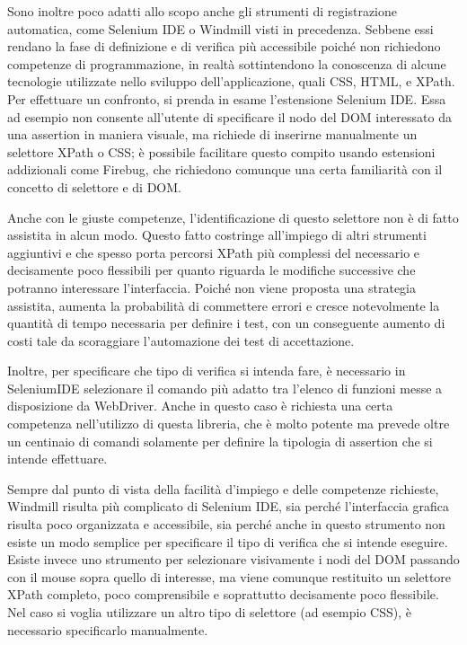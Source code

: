 Sono inoltre poco adatti allo scopo anche gli strumenti di registrazione automatica, come Selenium IDE o Windmill visti in precedenza. Sebbene essi rendano la fase di definizione e di verifica più accessibile poiché non richiedono competenze di programmazione, in realtà sottintendono la conoscenza di alcune tecnologie utilizzate nello sviluppo dell'applicazione, quali CSS, HTML, e XPath. 
Per effettuare un confronto, si prenda in esame l'estensione Selenium IDE. Essa ad esempio non consente all'utente di specificare il nodo del DOM interessato da una assertion in maniera visuale, ma richiede di inserirne manualmente un selettore XPath o CSS; è possibile facilitare questo compito usando estensioni addizionali come Firebug, che richiedono comunque una certa familiarità con il concetto di selettore e di DOM. 

Anche con le giuste competenze, l'identificazione di questo selettore non è di fatto assistita in alcun modo. Questo fatto costringe all'impiego di altri strumenti aggiuntivi e che spesso porta  percorsi XPath più complessi del necessario e decisamente poco flessibili per quanto riguarda le modifiche successive che potranno interessare l'interfaccia. Poiché non viene proposta una strategia assistita, aumenta la probabilità di commettere errori e cresce notevolmente la quantità di tempo necessaria per definire i test, con un conseguente aumento di costi tale da scoraggiare l'automazione dei test di accettazione. 

Inoltre, per specificare che tipo di verifica si intenda fare, è necessario in SeleniumIDE selezionare il comando più adatto tra l'elenco di funzioni messe a disposizione da WebDriver. Anche in questo caso è richiesta una certa competenza nell'utilizzo di questa libreria, che è molto potente ma prevede oltre un centinaio di comandi solamente per definire la tipologia di assertion che si intende effettuare.

Sempre dal punto di vista della facilità d'impiego e delle competenze richieste, Windmill risulta più complicato di Selenium IDE, sia perché l'interfaccia grafica risulta poco organizzata e accessibile, sia perché anche in questo strumento non esiste un modo semplice per specificare il tipo di verifica che si intende eseguire. Esiste invece uno strumento per selezionare visivamente i nodi del DOM passando con il mouse sopra quello di interesse, ma viene comunque restituito un selettore XPath completo, poco comprensibile e soprattutto decisamente poco flessibile. Nel caso si voglia utilizzare un altro tipo di selettore (ad esempio CSS), è necessario specificarlo manualmente.

